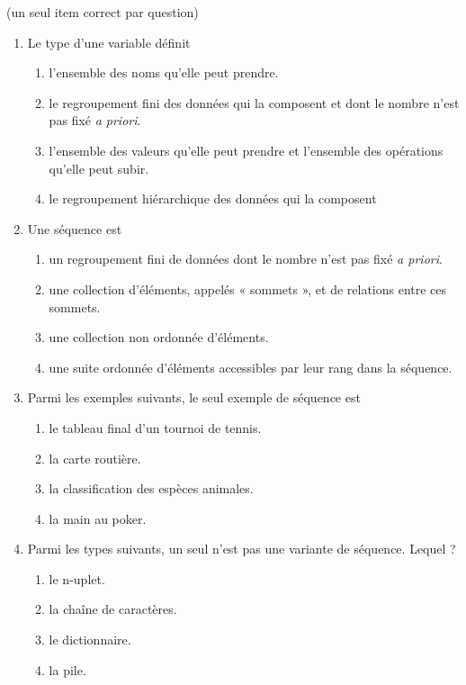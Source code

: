 \begin{td}[QCM (4)]\label{td:qcmListes}(un seul item correct par question)
\em
\begin{enumerate}
\item Le type d'une variable définit 
	\begin{enumerate}
	\item l'ensemble des noms qu'elle peut prendre.
	\item le regroupement fini des données qui la composent et
		dont le nombre n'est pas fixé {\em a priori}.
	\item l'ensemble des valeurs qu'elle peut prendre et 
		l'ensemble des opérations qu'elle peut subir.
	\item le regroupement hiérarchique des données qui la composent 
	\end{enumerate}

\item Une séquence est 
	\begin{enumerate}
	\item un regroupement fini de données dont le nombre 
		n'est pas fixé {\em a priori}.
	\item une collection d'éléments, appelés « sommets », et de 
		relations entre ces sommets.
	\item une collection non ordonnée d'éléments.
	\item une suite ordonnée d'éléments
		accessibles par leur rang dans la séquence.
	\end{enumerate}

\item Parmi les exemples suivants, le seul exemple de séquence est
	\begin{enumerate}
	\item le tableau final d'un tournoi de tennis.
	\item la carte routière.
	\item la classification des espèces animales.
	\item la main au poker.
	\end{enumerate}

\item Parmi les types suivants, un seul n'est pas une variante de séquence. Lequel ?
	\begin{enumerate}
	\item le n-uplet.
	\item la chaîne de caractères.
	\item le dictionnaire.
	\item la pile.
	\end{enumerate}


\end{enumerate}
\end{td}
